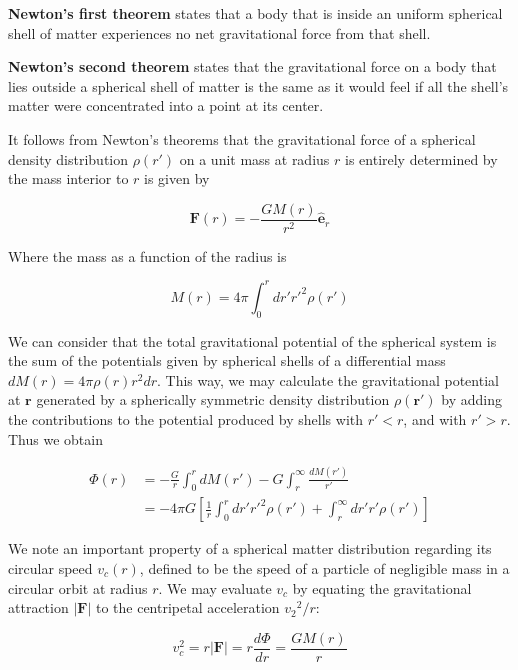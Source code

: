 \textbf{Newton's first theorem} states that a body that is inside an uniform spherical shell of matter experiences no net gravitational force from that shell. 

\textbf{Newton's second theorem} states that the gravitational force on a body that lies outside a spherical shell of matter is the same as it would feel if all the shell's matter were concentrated into a point at its center. 

It follows from Newton's theorems that the gravitational force of a spherical density distribution $\rho(r')$ on a unit mass at radius $r$ is entirely determined by the mass interior to $r$ is given by

\begin{equation}
\textbf{F}(r)=-\frac{GM(r)}{r^{2}}\hat{\textbf{e}}_{r}
\end{equation}

Where the mass as a function of the radius is

\begin{equation}
M(r)=4\pi\int_{0}^{r}dr'r'^{2}\rho(r')
\end{equation}

We can consider that the total gravitational potential of the spherical system is the sum of the potentials given by spherical shells of a differential mass $dM(r)=4\pi\rho(r)r^{2}dr$. This way, we may calculate the gravitational potential at $\textbf{r}$ generated by a spherically symmetric density distribution $\rho(\textbf{r}')$ by adding the contributions to the potential produced by shells with $r'<r$, and with $r'>r$. Thus we obtain

\begin{equation}
	\begin{aligned}	
	\Phi(r) &= -\frac{G}{r}\int_{0}^{r}dM(r')-G\int_{r}^{\infty}\frac{dM(r')} {r'}\\      &= -4\pi G\left[\frac{1}{r}\int_{0}^{r}dr'r'^{2}\rho(r')+\int_{r}^{\infty}dr'r'\rho(r')\right]
	\end{aligned}
\end{equation} 

We note an important property of a spherical matter distribution regarding its circular speed $v_{c}(r)$, defined to be the speed of a particle of negligible mass in a circular orbit at radius $r$. We may evaluate $v_{c}$ by equating the gravitational attraction $|\textbf{F}|$  to the centripetal acceleration ${v_{2}}^{2}/r$:

\begin{equation}
v_{c}^{2}=r|\textbf{F}|=r\frac{d\Phi}{dr}=\frac{GM(r)}{r}
\end{equation}

